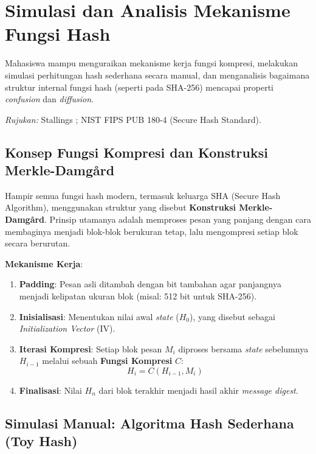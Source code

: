 \section{Simulasi dan Analisis Mekanisme Fungsi Hash}

\begin{subcpmk}
  \item Mahasiswa mampu menguraikan mekanisme kerja fungsi kompresi, melakukan simulasi perhitungan hash sederhana secara manual, dan menganalisis bagaimana struktur internal fungsi hash (seperti pada SHA-256) mencapai properti \textit{confusion} dan \textit{diffusion}.
\end{subcpmk}

\noindent\textit{Rujukan:} Stallings \cite{stallings2017}; NIST FIPS PUB 180-4 (Secure Hash Standard).

\subsection{Konsep Fungsi Kompresi dan Konstruksi Merkle-Damgård}

Hampir semua fungsi hash modern, termasuk keluarga SHA (Secure Hash Algorithm), menggunakan struktur yang disebut \textbf{Konstruksi Merkle-Damgård}. Prinsip utamanya adalah memproses pesan yang panjang dengan cara membaginya menjadi blok-blok berukuran tetap, lalu mengompresi setiap blok secara berurutan.

\textbf{Mekanisme Kerja}:
\begin{enumerate}
    \item \textbf{Padding}: Pesan asli ditambah dengan bit tambahan agar panjangnya menjadi kelipatan ukuran blok (misal: 512 bit untuk SHA-256).
    \item \textbf{Inisialisasi}: Menentukan nilai awal \textit{state} ($H_0$), yang disebut sebagai \textit{Initialization Vector} (IV).
    \item \textbf{Iterasi Kompresi}: Setiap blok pesan $M_i$ diproses bersama \textit{state} sebelumnya $H_{i-1}$ melalui sebuah \textbf{Fungsi Kompresi} $C$:
    \begin{equation}
      H_i = C(H_{i-1}, M_i)
    \end{equation}
    \item \textbf{Finalisasi}: Nilai $H_n$ dari blok terakhir menjadi hasil akhir \textit{message digest}.
\end{enumerate}

\subsection{Simulasi Manual: Algoritma Hash Sederhana (Toy Hash)}

